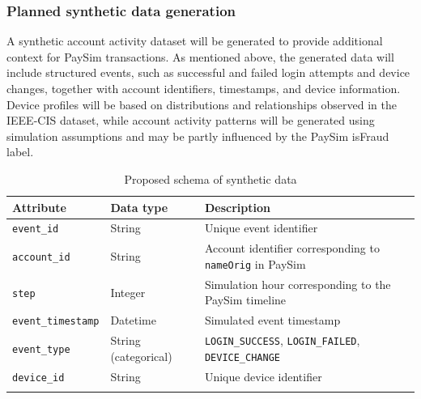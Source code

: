 \documentclass[titlepage]{article}
\begin{document}
\subsubsection{Planned synthetic data generation}
A synthetic account activity dataset will be generated to provide additional context for PaySim transactions. As mentioned above, the generated data will include structured events, such as successful and failed login attempts and device changes, together with account identifiers, timestamps, and device information. Device profiles will be based on distributions and relationships observed in the IEEE-CIS dataset, while account activity patterns will be generated using simulation assumptions and may be partly influenced by the PaySim isFraud label.
\begin{table}[H]
    \centering
    \caption{Proposed schema of synthetic data}
    \label{tab:synthetic_events_schema}
    \small
    \renewcommand{\arraystretch}{1.3}
    \begin{tabularx}{\textwidth}{@{}l l X@{}}
        \toprule
        \textbf{Attribute} & \textbf{Data type} & \textbf{Description} \\
        \midrule

        \texttt{event\_id} & String & Unique event identifier \\

        \addlinespace

        \texttt{account\_id} & String & Account identifier corresponding to \texttt{nameOrig} in PaySim \\

        \addlinespace

        \texttt{step} & Integer & Simulation hour corresponding to the PaySim timeline \\

        \addlinespace

        \texttt{event\_timestamp} & Datetime & Simulated event timestamp \\

        \addlinespace

        \texttt{event\_type} & String (categorical) & \texttt{LOGIN\_SUCCESS}, \texttt{LOGIN\_FAILED}, \texttt{DEVICE\_CHANGE} \\

        \addlinespace

        \texttt{device\_id} & String & Unique device identifier \\

        \addlinespace


\end{tabularx}
\end{table}
\end{document}
